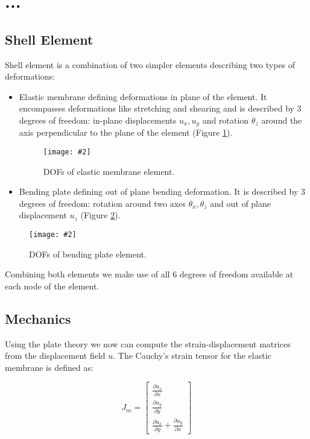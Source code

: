 \documentclass{egpubl}
\newcommand{\deriv}[2]{\frac{\partial #1}{\partial #2}}
\newcommand{\Figure}[3]{%
\begin{figure}[htb]
  \centering
  \texttt{[image: \#2]}
  \caption{\label{fig-#2}#3}
\end{figure}}
\begin{document}



\section{...} %

\subsection{Shell Element}

Shell element is a combination of two simpler elements describing two types
of deformations:

\begin{itemize}

    \item Elastic membrane defining deformations in plane of the
    element. It encompasses deformations like stretching and shearing and
    is described by 3 degrees of freedom: in-plane displacements $u_x, u_y$
    and rotation $\theta_z$ around the axis perpendicular to the plane of
    the element (Figure \ref{fig-membrane}).

\Figure{0.8\linewidth}{membrane}
{DOFs of elastic membrane element.}


    \item Bending plate defining out of plane bending deformation. It is
    described by 3 degrees of freedom: rotation around two axes $\theta_x,
    \theta_z$ and out of plane displacement $u_z$ (Figure \ref{fig-plate}).

\end{itemize}

\Figure{0.8\linewidth}{plate}
{DOFs of bending plate element.}

Combining both elements we make use of all 6 degrees of freedom available
at each node of the element.


\subsection{Mechanics} %

Using the plate theory we now can compute the strain-displacement matrices
from the displacement field $u$. The Cauchy's strain tensor for the
elastic membrane is defined as:

\begin{equation}\label{eq-cauchy}
    J_m = \left[ \begin{matrix}
        \deriv{u_x}{x} \\
        \deriv{u_y}{y} \\
        \deriv{u_x}{y} + \deriv{u_y}{x}
    \end{matrix} \right]
\end{equation}
\end{document}
